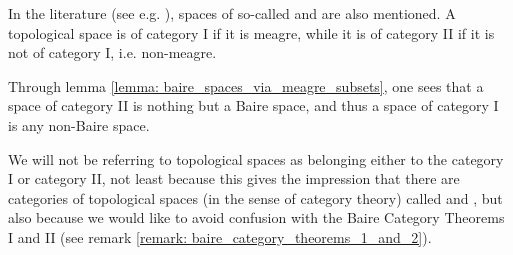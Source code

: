         \begin{remark}
            In the literature (see e.g. \cite[Definition, p. 37]{litvak_functional_analysis_notes}), spaces of so-called  and  are also mentioned. A topological space is of category I if it is meagre, while it is of category II if it is not of category I, i.e. non-meagre.

            Through lemma \ref{lemma: baire_spaces_via_meagre_subsets}, one sees that a space of category II is nothing but a Baire space, and thus a space of category I is any non-Baire space.

            We will not be referring to topological spaces as belonging either to the category I or category II, not least because this gives the impression that there are categories of topological spaces (in the sense of category theory) called  and , but also because we would like to avoid confusion with the Baire Category Theorems I and II (see remark \ref{remark: baire_category_theorems_1_and_2}).
        \end{remark}
            
